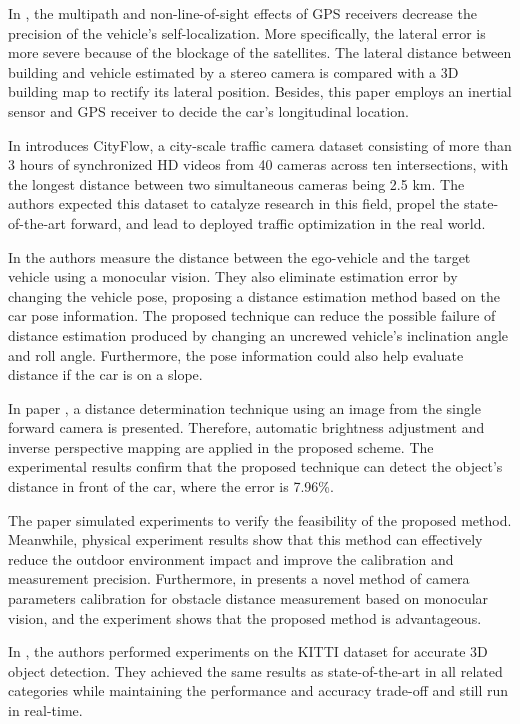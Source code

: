 In \cite{Bao2016}, the multipath and non-line-of-sight effects of GPS receivers decrease the precision of the vehicle's self-localization. More specifically, the lateral error is more severe because of the blockage of the satellites. The lateral distance between building and vehicle estimated by a stereo camera is compared with a 3D building map to rectify its lateral position. Besides, this paper employs an inertial sensor and GPS receiver to decide the car's longitudinal location.

In \cite{Tang2019} introduces CityFlow, a city-scale traffic camera dataset consisting of more than 3 hours of synchronized HD videos from 40 cameras across ten intersections, with the longest distance between two simultaneous cameras being 2.5 km. The authors expected this dataset to catalyze research in this field, propel the state-of-the-art forward, and lead to deployed traffic optimization in the real world.

In \cite{Qi2019} the authors measure the distance between the ego-vehicle and the target vehicle using a monocular vision. They also eliminate estimation error by changing the vehicle pose, proposing a distance estimation method based on the car pose information. The proposed technique can reduce the possible failure of distance estimation produced by changing an uncrewed vehicle's inclination angle and roll angle. Furthermore, the pose information could also help evaluate distance if the car is on a slope.

In paper \cite{Wongsaree2018}, a distance determination technique using an image from the single forward camera is presented. Therefore, automatic brightness adjustment and inverse perspective mapping are applied in the proposed scheme. The experimental results confirm that the proposed technique can detect the object's distance in front of the car, where the error is 7.96\%.

The paper \cite{Pan2019} simulated experiments to verify the feasibility of the proposed method. Meanwhile, physical experiment results show that this method can effectively reduce the outdoor environment impact and improve the calibration and measurement precision. Furthermore, in \cite{Lin2014} presents a novel method of camera parameters calibration for obstacle distance measurement based on monocular vision, and the experiment shows that the proposed method is advantageous.

In \cite{Simon2019a}, the authors performed experiments on the KITTI dataset for accurate 3D object detection. They achieved the same results as state-of-the-art in all related categories while maintaining the performance and accuracy trade-off and still run in real-time.

